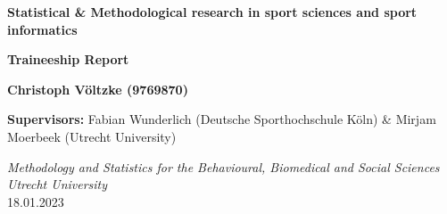 \documentclass{article}
\begin{document}
\begin{titlepage}
   \begin{center}
       \vspace*{1cm}

       \LARGE\textbf{Statistical \& Methodological research in sport sciences and sport informatics}

            
       \vspace{1.5cm}

        \Large\textbf{Traineeship Report}

        \vspace{1.5cm}
        
        \large\textbf{Christoph Völtzke (9769870)}

        \vspace{2.5 cm}
 
        \textbf{Supervisors:} Fabian Wunderlich (Deutsche Sporthochschule Köln) \& Mirjam Moerbeek (Utrecht University)\\
        
       \vspace{2.5 cm}
       
       \textit{Methodology and Statistics for the Behavioural, Biomedical and Social Sciences}\\
       
       \vspace{1 cm}
       \textit{Utrecht University}\\
       \vspace{1 cm}
        18.01.2023 \\
   \end{center}
\end{titlepage}


\newpage


\newpage
\printbibliography
\newpage

\end{document}
